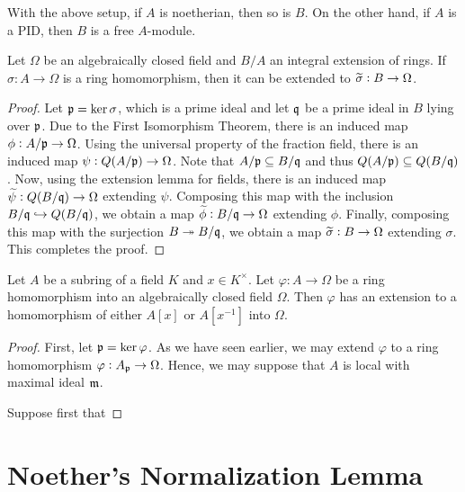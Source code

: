 \begin{corollary}
    With the above setup, if $A$ is noetherian, then so is $B$. On the other hand, if $A$ is a PID, then $B$ is a free $A$-module.
\end{corollary}

\begin{theorem}
    Let $\Omega$ be an algebraically closed field and $B/A$ an integral extension of rings. If $\sigma: A\to\Omega$ is a ring homomorphism, then it can be extended to $\widetilde{\sigma}: B\to\Omega$.
\end{theorem}
\begin{proof}
    Let $\mathfrak p = \ker\sigma$, which is a prime ideal and let $\mathfrak q$ be a prime ideal in $B$ lying over $\mathfrak p$. Due to the First Isomorphism Theorem, there is an induced map $\phi: A/\mathfrak p\to\Omega$. Using the universal property of the fraction field, there is an induced map $\psi: Q(A/\mathfrak p)\to\Omega$. Note that $A/\mathfrak p\subseteq B/\mathfrak q$ and thus $Q(A/\mathfrak p)\subseteq Q(B/\mathfrak q)$. Now, using the extension lemma for fields, there is an induced map $\widetilde{\psi}: Q(B/\mathfrak q)\to\Omega$ extending $\psi$. Composing this map with the inclusion $B/\mathfrak q\hookrightarrow Q(B/\mathfrak q)$, we obtain a map $\widetilde{\phi}: B/\mathfrak q\to\Omega$ extending $\phi$. Finally, composing this map with the surjection $B\twoheadrightarrow B/\mathfrak q$, we obtain a map $\widetilde{\sigma}: B\to\Omega$ extending $\sigma$. This completes the proof.
\end{proof}

\begin{lemma}
    Let $A$ be a subring of a field $K$ and $x\in K^\times$. Let $\varphi: A\to\Omega$ be a ring homomorphism into an algebraically closed field $\Omega$. Then $\varphi$ has an extension to a homomorphism of either $A[x]$ or $A[x^{-1}]$ into $\Omega$.
\end{lemma}
\begin{proof}
    First, let $\mathfrak p = \ker\varphi$. As we have seen earlier, we may extend $\varphi$ to a ring homomorphism $\varphi: A_\mathfrak p\to\Omega$. Hence, we may suppose that $A$ is local with maximal ideal $\mathfrak m$. 

    Suppose first that 
\end{proof}

\section{Noether's Normalization Lemma}

